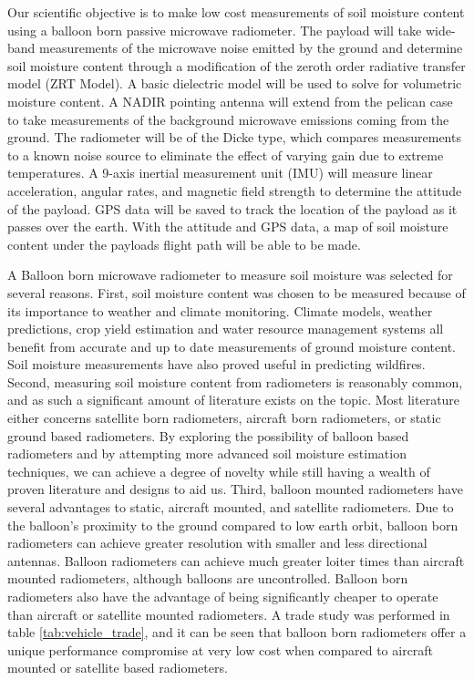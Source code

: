\documentclass[12pt]{article}
\begin{document}
Our scientific objective is to make low cost measurements of soil moisture content using a balloon born passive microwave radiometer. The payload will take wide-band measurements of the microwave noise emitted by the ground and determine soil moisture content through a modification of the zeroth order radiative transfer model (ZRT Model). A basic dielectric model will be used to solve for volumetric moisture content. \cite{ulaby_fung_moore_1986} A NADIR pointing antenna will extend from the pelican case to take measurements of the background microwave emissions coming from the ground. The radiometer will be of the Dicke type, which compares measurements to a known noise source to eliminate the effect of varying gain due to extreme temperatures. A 9-axis inertial measurement unit (IMU) will measure linear acceleration, angular rates, and magnetic field strength to determine the attitude of the payload. GPS data will be saved to track the location of the payload as it passes over the earth. With the attitude and GPS data, a map of soil moisture content under the payloads flight path will be able to be made. 

A Balloon born microwave radiometer to measure soil moisture was selected for several reasons. First, soil moisture content was chosen to be measured because of its importance to weather and climate monitoring.\cite{Pan2001} Climate models, weather predictions, crop yield estimation and water resource management systems all benefit from accurate and up to date measurements of ground moisture content. Soil moisture measurements have also proved useful in predicting wildfires.\cite{chaparro_piles_vall-llossera_2016,krueger_ochsner_quiring_engle_carlson_twidwell_fuhlendorf_2017} Second, measuring soil moisture content from radiometers is reasonably common, and as such a significant amount of literature exists on the topic. Most literature either concerns satellite born radiometers, aircraft born radiometers, or static ground based radiometers. \cite{Hanington,Kerr2001,ulaby_fung_moore_1986,Friesen2008,Schmugge1994} By exploring the possibility of balloon based radiometers and by attempting more advanced soil moisture estimation techniques, we can achieve a degree of novelty while still having a wealth of proven literature and designs to aid us. Third, balloon mounted radiometers have several advantages to static, aircraft mounted, and satellite radiometers. Due to the balloon's proximity to the ground compared to low earth orbit, balloon born radiometers can achieve greater resolution with smaller and less directional antennas. Balloon radiometers can achieve much greater loiter times than aircraft mounted radiometers, although balloons are uncontrolled. Balloon born radiometers also have the advantage of being significantly cheaper to operate than aircraft or satellite mounted radiometers. A trade study was performed in table \ref{tab:vehicle_trade}, and it can be seen that balloon born radiometers offer a unique performance compromise at very low cost when compared to aircraft mounted or satellite based radiometers.
\end{document}
